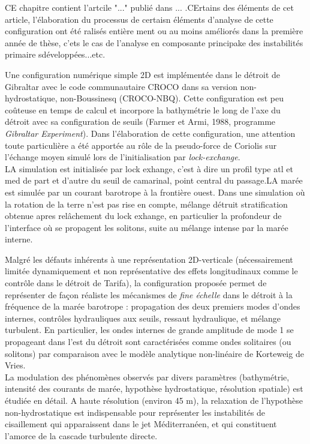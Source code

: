 \documentclass[a4paper,12pt,notitlepage,twoside]{report}
\numberwithin{equation}{section}
\begin{document}
CE chapitre contient l'artcile "..." publié dans ... .CErtains des éléments de cet article, l'élaboration du processus de 
certaisn éléments d'analyse de cette configuration ont été ralisés entière ment ou au moins améliorés dans la première année de thèse, c'ets le cas de l'analyse en composante principake des instabilités primaire sdéveloppées...etc.


Une configuration numérique simple 2D est implémentée dans le détroit de Gibraltar avec le code communautaire CROCO dans sa version non-hydrostatique, non-Boussinesq (CROCO-NBQ). Cette configuration est peu coûteuse en temps de calcul et incorpore la bathymétrie le long de l'axe du détroit avec sa configuration de seuils (Farmer et Armi, 1988, programme \textit{Gibraltar Experiment}). Dans l'élaboration de cette configuration, une attention toute particulière a été apportée au rôle de la pseudo-force de Coriolis sur l'échange moyen simulé lors de l'initialisation par \textit{lock-exchange}.\\

LA simulation est initialisée par lock exhange, c'est à dire un profil type atl et med de part et d'autre du seuil de camarinal, point central du passage.LA marée est simulée par un courant barotrope à la frontière ouest. Dans une simulation où la rotation de la terre n'est pas rise en compte, mélange détruit stratification obtenue apres relâchement du lock exhange, en particulier la profondeur de l'interface où se propagent les solitons, suite au mélange intense par la marée interne.


Malgré les défauts inhérents à une représentation 2D-verticale (nécessairement limitée dynamiquement et non représentative des effets longitudinaux comme le contrôle dans le détroit de Tarifa), la configuration proposée permet de représenter de façon réaliste les mécanismes de \textit{fine échelle} dans le détroit à la fréquence de la marée barotrope : propagation des deux premiers modes d'ondes internes, contrôles hydrauliques aux seuils, ressaut hydraulique, et mélange turbulent. En particulier, les ondes internes de grande amplitude de mode 1 se propageant dans l'est du détroit sont caractérisées comme ondes solitaires (ou solitons) par comparaison avec le modèle analytique non-linéaire de Korteweig de Vries.\\

La modulation des phénomènes observés par divers paramètres (bathymétrie, intensité des courants de marée, hypothèse hydrostatique, résolution spatiale) est étudiée en détail. A haute résolution (environ 45 m), la relaxation de l'hypothèse non-hydrostatique est indispensable pour représenter les instabilités de cisaillement qui apparaissent dans le jet Méditerranéen, et qui constituent l'amorce de la cascade turbulente directe.
\end{document}
